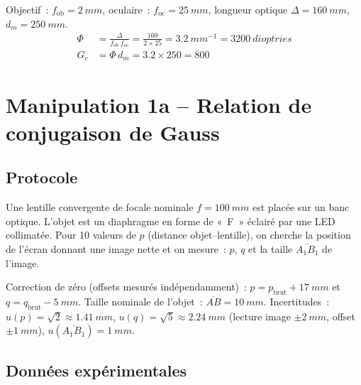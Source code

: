 ﻿\documentclass[a4paper, 11pt]{article}
\begin{document}
Objectif~: $f_\mathrm{ob} = \SI{2}{mm}$, oculaire~: $f_\mathrm{oc} = \SI{25}{mm}$, longueur optique $\Delta = \SI{160}{mm}$, $d_m = \SI{250}{mm}$.
\begin{align*}
  \Phi &= \frac{\Delta}{f_\mathrm{ob}\,f_\mathrm{oc}} = \frac{160}{2\times 25} = \SI{3.2}{mm^{-1}} = \SI{3200}{dioptries} \\
  G_c  &= \Phi\,d_m = 3.2 \times 250 = 800
\end{align*}

\section{Manipulation 1a – Relation de conjugaison de Gauss}

\subsection{Protocole}

Une lentille convergente de focale nominale $f = \SI{100}{mm}$ est placée sur un banc optique. L'objet est un diaphragme en forme de «~F~» éclairé par une LED collimatée. Pour 10 valeurs de $p$ (distance objet–lentille), on cherche la position de l'écran donnant une image nette et on mesure~: $p$, $q$ et la taille $\overline{A_1B_1}$ de l'image.

Correction de zéro (offsets mesurés indépendamment)~: $p = p_\text{brut} + \SI{17}{mm}$ et $q = q_\text{brut} - \SI{5}{mm}$. Taille nominale de l'objet~: $\overline{AB} = \SI{10}{mm}$. Incertitudes~: $u(p) = \sqrt{2} \approx \SI{1.41}{mm}$, $u(q) = \sqrt{5} \approx \SI{2.24}{mm}$ (lecture image $\pm\SI{2}{mm}$, offset $\pm\SI{1}{mm}$), $u(\overline{A_1B_1}) = \SI{1}{mm}$.

\subsection{Données expérimentales}
\end{document}
